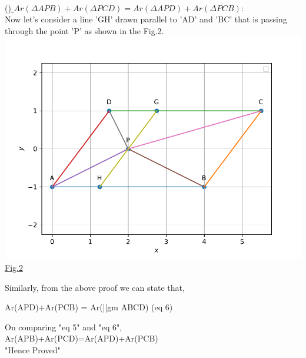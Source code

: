 \documentclass[10pt,a4paper]{report}
\begin{document}
\begin{multicols}{2}
\\ \raggedright \underline{() $Ar(\Delta APB)+Ar(\Delta PCD)=Ar(\Delta APD)+Ar(\Delta PCB):$} \\
\vspace{2mm} \hspace{1cm} Now let's consider a line 'GH' drawn parallel to 'AD' and 'BC' that is passing through the point 'P' as shown in the Fig.2.\\ \centering
\vspace{2mm} \includegraphics[scale=0.4]{fig2.pdf} \\ \underline{Fig.2} \vspace{3mm} \\ \raggedright Similarly, from the above proof we can state that, \\ \raggedright \Rightarrow Ar(\Delta APD)+Ar(\Delta PCB) = Ar(||gm ABCD) \hspace{5mm} (eq 6) \vspace{4mm} \\ \raggedright On comparing "eq 5" and "eq 6", \vspace{2mm}\\ \therefore Ar(\Delta APB)+Ar(\Delta PCD)=Ar(\Delta APD)+Ar(\Delta PCB) \\ \vspace{2mm} \centering "Hence Proved"
\vspace{3cm}


\end{multicols}
\end{document}
